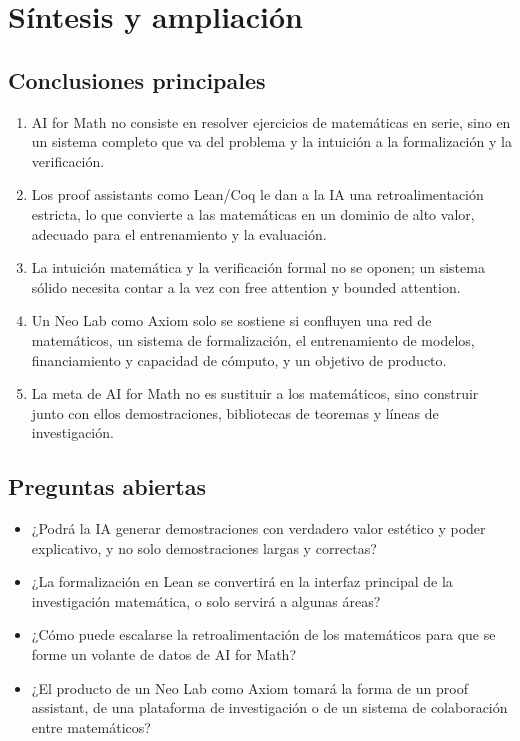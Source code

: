 \section{Síntesis y ampliación}

\subsection{Conclusiones principales}

\begin{enumerate}
\item AI for Math no consiste en resolver ejercicios de matemáticas en serie, sino en un sistema completo que va del problema y la intuición a la formalización y la verificación.
\item Los proof assistants como Lean/Coq le dan a la IA una retroalimentación estricta, lo que convierte a las matemáticas en un dominio de alto valor, adecuado para el entrenamiento y la evaluación.
\item La intuición matemática y la verificación formal no se oponen; un sistema sólido necesita contar a la vez con free attention y bounded attention.
\item Un Neo Lab como Axiom solo se sostiene si confluyen una red de matemáticos, un sistema de formalización, el entrenamiento de modelos, financiamiento y capacidad de cómputo, y un objetivo de producto.
\item La meta de AI for Math no es sustituir a los matemáticos, sino construir junto con ellos demostraciones, bibliotecas de teoremas y líneas de investigación.
\end{enumerate}

\subsection{Preguntas abiertas}

\begin{itemize}
\item ¿Podrá la IA generar demostraciones con verdadero valor estético y poder explicativo, y no solo demostraciones largas y correctas?
\item ¿La formalización en Lean se convertirá en la interfaz principal de la investigación matemática, o solo servirá a algunas áreas?
\item ¿Cómo puede escalarse la retroalimentación de los matemáticos para que se forme un volante de datos de AI for Math?
\item ¿El producto de un Neo Lab como Axiom tomará la forma de un proof assistant, de una plataforma de investigación o de un sistema de colaboración entre matemáticos?
\end{itemize}

